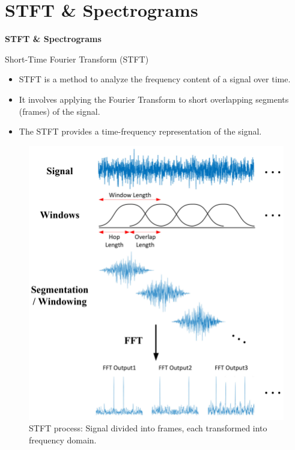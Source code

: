 \section{STFT \& Spectrograms}
\begin{frame}{}
    \LARGE \textbf{STFT \& Spectrograms}
\end{frame}

\begin{frame}[allowframebreaks]{Short-Time Fourier Transform (STFT)}
    \begin{itemize}
        \item STFT is a method to analyze the frequency content of a signal over time.
        \item It involves applying the Fourier Transform to short overlapping segments (frames) of the signal.
        \item The STFT provides a time-frequency representation of the signal.
    \end{itemize}
    \begin{figure}
        \centering
        \includegraphics[width=\textwidth,height=0.8\textheight,keepaspectratio]{images/audio-nlp/stft-diagram.png}
        \caption*{STFT process: Signal divided into frames, each transformed into frequency domain.}
    \end{figure}

\end{frame}
